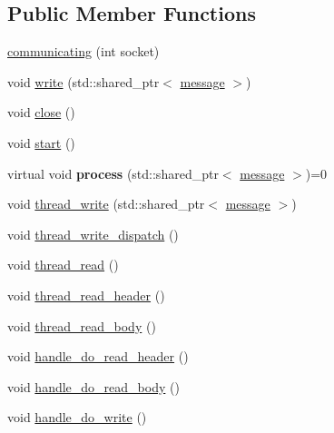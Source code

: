 \subsection*{\-Public \-Member \-Functions}
\begin{DoxyCompactItemize}
\item 
\hyperlink{classgal_1_1network_1_1communicating_adccfea2eeae7892217bf01f71f011d93}{communicating} (int socket)
\item 
void \hyperlink{classgal_1_1network_1_1communicating_ad839348b2caf46ddee874b78afaaeb1f}{write} (std\-::shared\-\_\-ptr$<$ \hyperlink{classgal_1_1network_1_1message}{message} $>$)
\item 
void \hyperlink{classgal_1_1network_1_1communicating_a3b39dcb940d746f44b6c2c72e198450d}{close} ()
\item 
void \hyperlink{classgal_1_1network_1_1communicating_a43bf55d2d11f1798b4814e069639a239}{start} ()
\item 
\hypertarget{classgal_1_1network_1_1communicating_a04bfdd09b09438aefb4683050437a211}{virtual void {\bfseries process} (std\-::shared\-\_\-ptr$<$ \hyperlink{classgal_1_1network_1_1message}{message} $>$)=0}\label{classgal_1_1network_1_1communicating_a04bfdd09b09438aefb4683050437a211}

\item 
void \hyperlink{classgal_1_1network_1_1communicating_ae183aa977aa6963e96a1abe2a94a749c}{thread\-\_\-write} (std\-::shared\-\_\-ptr$<$ \hyperlink{classgal_1_1network_1_1message}{message} $>$)
\item 
void \hyperlink{classgal_1_1network_1_1communicating_a32da51cf806bdc60b1a653ef20557af9}{thread\-\_\-write\-\_\-dispatch} ()
\item 
void \hyperlink{classgal_1_1network_1_1communicating_abd5efaa6563dda2097f69ae3679f87a1}{thread\-\_\-read} ()
\item 
void \hyperlink{classgal_1_1network_1_1communicating_aa7ef767d5117ba5d99cddcb1d7696a1d}{thread\-\_\-read\-\_\-header} ()
\item 
void \hyperlink{classgal_1_1network_1_1communicating_aeba5f8e491d9c6a4ddd75aa0a698bed9}{thread\-\_\-read\-\_\-body} ()
\item 
void \hyperlink{classgal_1_1network_1_1communicating_ab1434959e6a6b7311e7189078679124f}{handle\-\_\-do\-\_\-read\-\_\-header} ()
\item 
void \hyperlink{classgal_1_1network_1_1communicating_a383465f75d9d656a0e80ea3f57963630}{handle\-\_\-do\-\_\-read\-\_\-body} ()
\item 
void \hyperlink{classgal_1_1network_1_1communicating_a5a0d9fbfe61ff1d35380854d8aa3860e}{handle\-\_\-do\-\_\-write} ()
\end{DoxyCompactItemize}
